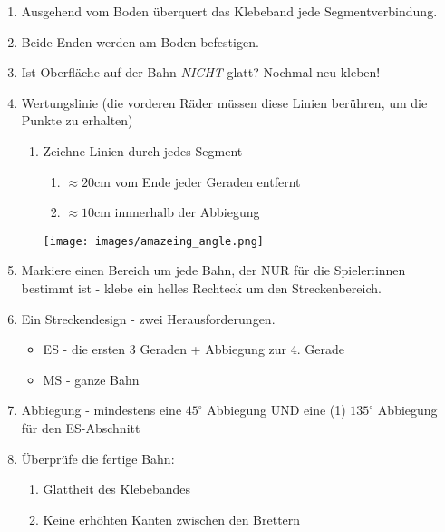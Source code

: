 \documentclass[a4paper,12pt]{article}
\begin{document}
\begin{enumerate}
	\item Ausgehend vom Boden überquert das Klebeband jede
		Segmentverbindung.
	\item Beide Enden werden am Boden befestigen.
	\item Ist Oberfläche auf der Bahn \emph{NICHT} glatt?
		Nochmal neu kleben!
	\item Wertungslinie (die vorderen Räder müssen diese
		Linien berühren, um die Punkte zu erhalten)
	\begin{enumerate}
		\item Zeichne Linien durch jedes Segment
		\begin{enumerate}
			\item $\approx 20 \mathrm{cm}$ vom Ende jeder Geraden entfernt
			\item $\approx 10 \mathrm{cm}$ innnerhalb der Abbiegung
		\end{enumerate}
		\texttt{[image: images/amazeing\_angle.png]}
	\end{enumerate}
	\item Markiere einen Bereich um jede Bahn, der NUR für die
		Spieler:innen bestimmt ist - klebe ein helles Rechteck um den
		Streckenbereich.
	\item  Ein Streckendesign - zwei Herausforderungen.
	\begin{itemize}
		\item ES - die ersten 3 Geraden + Abbiegung zur 4. Gerade
		\item MS - ganze Bahn
	\end{itemize}
	\item Abbiegung - mindestens eine $45^{\circ}$ Abbiegung UND eine (1)
		$135^{\circ}$ Abbiegung für den ES-Abschnitt
	\item Überprüfe die fertige Bahn:
	\begin{enumerate}
		\item Glattheit des Klebebandes
		\item Keine erhöhten Kanten zwischen den Brettern
	\end{enumerate}
\end{enumerate}
\end{document}
